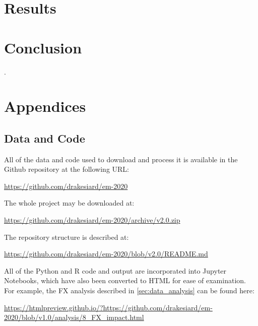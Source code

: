 \documentclass[12pt,a4paper]{article}
\begin{document}
\section{Results}\label{sec:results}

\section{Conclusion}\label{sec:conclusion}

\clearpage

\appendix

\renewcommand{\refname}{\section{References}\label{sec:references}}.


\clearpage

\section{Appendices}

\subsection{Data and Code}\label{sec:data_and_code}

All of the data and code used to download and process it is available in the Github repository at the following URL:

\url{https://github.com/drakesiard/em-2020}

\noindent
The whole project may be downloaded at:

\url{https://github.com/drakesiard/em-2020/archive/v2.0.zip}

\noindent
The repository structure is described at:

\url{https://github.com/drakesiard/em-2020/blob/v2.0/README.md}

\noindent
All of the Python and R code and output are incorporated into Jupyter Notebooks, which have also been converted to HTML for ease of examination. For example, the FX analysis described in \cref{sec:data_analysis} can be found here:

\begin{adjustbox}{max width=\textwidth}
\url{https://htmlpreview.github.io/?https://github.com/drakesiard/em-2020/blob/v1.0/analysis/8_FX_impact.html}
\end{adjustbox}
\end{document}
